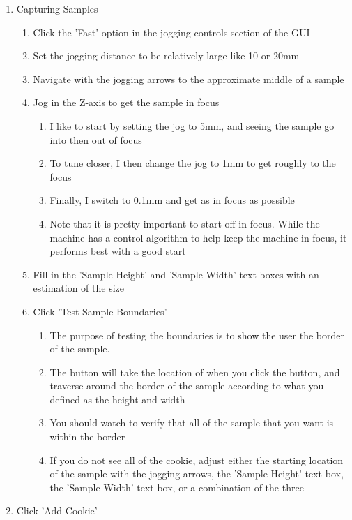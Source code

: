 \documentclass{article}
\begin{document}
\begin{outline}[enumerate]
\begin{enumerate}
\begin{enumerate}
		\end{enumerate}
\item Capturing Samples
    \begin{enumerate}
    \item Click the 'Fast' option in the jogging controls section of the GUI
    \item Set the jogging distance to be relatively large like 10 or 20mm
    \item Navigate with the jogging arrows to the approximate middle of a sample
    \item Jog in the Z-axis to get the sample in focus
        \begin{enumerate}
        \item I like to start by setting the jog to 5mm, and seeing the sample go into then out of focus
        \item To tune closer, I then change the jog to 1mm to get roughly to the focus
        \item Finally, I switch to 0.1mm and get as in focus as possible
        \item Note that it is pretty important to start off in focus. While the machine has a control algorithm to help keep the machine in focus, it performs best with a good start
        \end{enumerate}
    \item Fill in the 'Sample Height' and 'Sample Width' text boxes with an estimation of the size
    \item Click 'Test Sample Boundaries'
        \begin{enumerate}
        \item The purpose of testing the boundaries is to show the user the border of the sample. 
        \item The button will take the location of when you click the button, and traverse around the border of the sample according to what you defined as the height and width
        \item You should watch to verify that all of the sample that you want is within the border
        \item If you do not see all of the cookie, adjust either the starting location of the sample with the jogging arrows, the 'Sample Height' text box, the 'Sample Width' text box, or a combination of the three
        \end{enumerate}
    \end{enumerate}
    \item Click 'Add Cookie'
        \begin{enumerate}

\end{enumerate}
\end{enumerate}
\end{outline}
\end{document}
